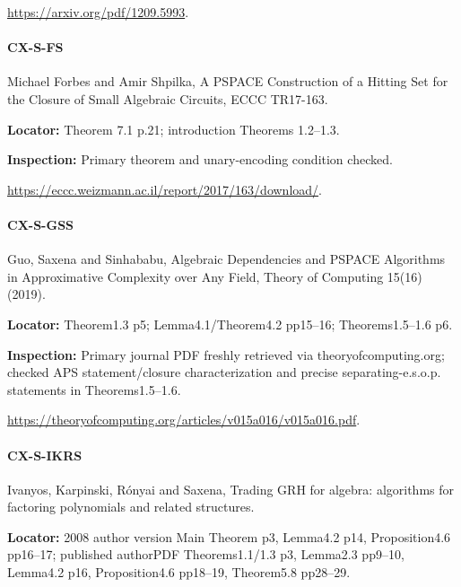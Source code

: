 \documentclass[11pt,a4paper]{article}
\begin{document}
\url{https://arxiv.org/pdf/1209.5993}.

\paragraph{CX-S-FS} Michael Forbes and Amir Shpilka, A PSPACE Construction of a Hitting Set for the Closure of Small Algebraic Circuits, ECCC TR17-163.

\textbf{Locator:} Theorem 7.\allowbreak{}1 p.\allowbreak{}21; introduction Theorems 1.\allowbreak{}2–\allowbreak{}1.\allowbreak{}3.

\textbf{Inspection:} Primary theorem and unary-encoding condition checked.\allowbreak{}

\url{https://eccc.weizmann.ac.il/report/2017/163/download/}.

\paragraph{CX-S-GSS} Guo, Saxena and Sinhababu, Algebraic Dependencies and PSPACE Algorithms in Approximative Complexity over Any Field, Theory of Computing 15(16) (2019).

\textbf{Locator:} Theorem1.\allowbreak{}3 p5; Lemma4.\allowbreak{}1/\allowbreak{}Theorem4.\allowbreak{}2 pp15–\allowbreak{}16; Theorems1.\allowbreak{}5–\allowbreak{}1.\allowbreak{}6 p6.

\textbf{Inspection:} Primary journal PDF freshly retrieved via theoryofcomputing.\allowbreak{}org; checked APS statement/\allowbreak{}closure characterization and precise separating-e.\allowbreak{}s.\allowbreak{}o.\allowbreak{}p.\allowbreak{} statements in Theorems1.\allowbreak{}5–\allowbreak{}1.\allowbreak{}6.\allowbreak{}

\url{https://theoryofcomputing.org/articles/v015a016/v015a016.pdf}.

\paragraph{CX-S-IKRS} Ivanyos, Karpinski, Rónyai and Saxena, Trading GRH for algebra:\allowbreak{} algorithms for factoring polynomials and related structures.

\textbf{Locator:} 2008 author version Main Theorem p3, Lemma4.\allowbreak{}2 p14, Proposition4.\allowbreak{}6 pp16–\allowbreak{}17; published authorPDF Theorems1.\allowbreak{}1/\allowbreak{}1.\allowbreak{}3 p3, Lemma2.\allowbreak{}3 pp9–\allowbreak{}10, Lemma4.\allowbreak{}2 p16, Proposition4.\allowbreak{}6 pp18–\allowbreak{}19, Theorem5.\allowbreak{}8 pp28–\allowbreak{}29.
\end{document}
